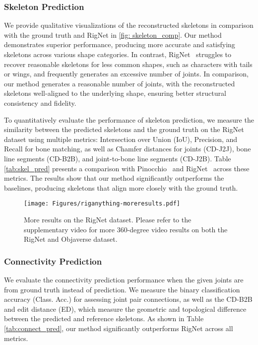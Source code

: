 \subsubsection{Skeleton Prediction} 

We provide qualitative visualizations of the reconstructed skeletons in comparison with the ground truth and RigNet in \cref{fig: skeleton_comp}. Our method demonstrates superior performance, producing more accurate and satisfying skeletons across various shape categories. In contrast, RigNet~\cite{rignet} struggles to recover reasonable skeletons for less common shapes, such as characters with tails or wings, and frequently generates an excessive number of joints. In comparison, our method generates a reasonable number of joints, with the reconstructed skeletons well-aligned to the underlying shape, ensuring better structural consistency and fidelity.

To quantitatively evaluate the performance of skeleton prediction, we measure the similarity between the predicted skeletons and the ground truth on the RigNet dataset using multiple metrics: Intersection over Union (IoU), Precision, and Recall for bone matching, as well as Chamfer distances for joints (CD-J2J), bone line segments (CD-B2B), and joint-to-bone line segments (CD-J2B). Table \ref{tab:skel_pred} presents a comparison with Pinocchio~\cite{pinocchio} and RigNet~\cite{rignet} across these metrics. The results show that our method significantly outperforms the baselines, producing skeletons that align more closely with the ground truth.



\begin{figure*}[t]
\texttt{[image: Figures/riganything-moreresults.pdf]}
\caption{More results on the RigNet dataset. Please refer to the supplementary video for more 360-degree video results on both the RigNet and Objaverse dataset.}
\label{fig: moreresults}
\end{figure*}


\subsubsection{Connectivity Prediction}

We evaluate the connectivity prediction performance when the given joints are from ground truth instead of prediction. We measure the binary classification accuracy (Class. Acc.) for assessing joint pair connections, as well as the CD-B2B and edit distance (ED), which measure the geometric and topological difference between the predicted and reference skeletons. As shown in Table \ref{tab:connect_pred}, our method significantly outperforms RigNet across all metrics.

